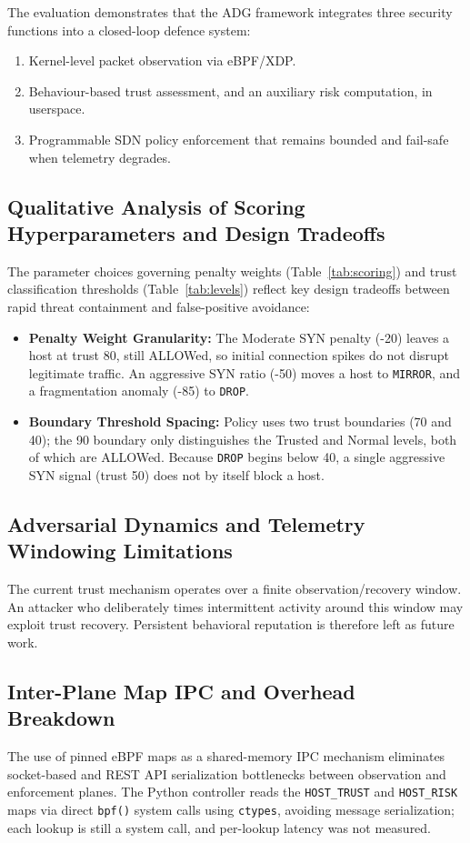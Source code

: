 \documentclass[conference]{IEEEtran}
\begin{document}
The evaluation demonstrates that the ADG framework integrates three security functions into a closed-loop defence system:
\begin{enumerate}
\item Kernel-level packet observation via eBPF/XDP.
\item Behaviour-based trust assessment, and an auxiliary risk computation, in userspace.
\item Programmable SDN policy enforcement that remains bounded and fail-safe when telemetry degrades.
\end{enumerate}

\subsection{Qualitative Analysis of Scoring Hyperparameters and Design Tradeoffs}
The parameter choices governing penalty weights (Table~\ref{tab:scoring}) and trust classification thresholds (Table~\ref{tab:levels}) reflect key design tradeoffs between rapid threat containment and false-positive avoidance:

\begin{itemize}
\item \textbf{Penalty Weight Granularity:} The Moderate SYN penalty (-20) leaves a host at trust 80, still ALLOWed, so initial connection spikes do not disrupt legitimate traffic. An aggressive SYN ratio (-50) moves a host to \texttt{MIRROR}, and a fragmentation anomaly (-85) to \texttt{DROP}.
\item \textbf{Boundary Threshold Spacing:} Policy uses two trust boundaries (70 and 40); the 90 boundary only distinguishes the Trusted and Normal levels, both of which are ALLOWed. Because \texttt{DROP} begins below 40, a single aggressive SYN signal (trust 50) does not by itself block a host.
\end{itemize}

\subsection{Adversarial Dynamics and Telemetry Windowing Limitations}
The current trust mechanism operates over a finite observation/recovery window. An attacker who deliberately times intermittent activity around this window may exploit trust recovery. Persistent behavioral reputation is therefore left as future work.

\subsection{Inter-Plane Map IPC and Overhead Breakdown}
The use of pinned eBPF maps as a shared-memory IPC mechanism eliminates socket-based and REST API serialization bottlenecks between observation and enforcement planes. The Python controller reads the \texttt{HOST\_TRUST} and \texttt{HOST\_RISK} maps via direct \texttt{bpf()} system calls using \texttt{ctypes}, avoiding message serialization; each lookup is still a system call, and per-lookup latency was not measured.
\end{document}

